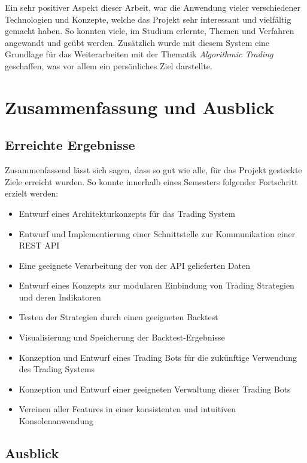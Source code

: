 \documentclass[oneside]{ausarbeitung}
\begin{document}
Ein sehr positiver Aspekt dieser Arbeit, war die Anwendung vieler verschiedener Technologien und Konzepte, welche das Projekt sehr interessant und vielfältig gemacht haben. So konnten viele, im Studium erlernte, Themen und Verfahren angewandt und geübt werden. Zusätzlich wurde mit diesem System eine Grundlage für das Weiterarbeiten mit der Thematik \textit{Algorithmic Trading} geschaffen, was vor allem ein persönliches Ziel darstellte.

\chapter{Zusammenfassung und Ausblick}
\label{cha:zusammenfassung}

\section{Erreichte Ergebnisse}
\label{sec:ergebnisse}

Zusammenfassend lässt sich sagen, dass so gut wie alle, für das Projekt gesteckte Ziele erreicht wurden. So konnte innerhalb eines Semesters folgender Fortschritt erzielt werden:

\begin{itemize}
	\item Entwurf eines Architekturkonzepts für das Trading System
	\item Entwurf und Implementierung einer Schnittstelle zur Kommunikation einer
		REST API
	\item Eine geeignete Verarbeitung der von der API gelieferten Daten
	\item Entwurf eines Konzepts zur modularen Einbindung von Trading Strategien
		und deren Indikatoren
	\item Testen der Strategien durch einen geeigneten Backtest
	\item Visualisierung und Speicherung der Backtest-Ergebnisse
	\item Konzeption und Entwurf eines Trading Bots für die zukünftige Verwendung
		des Trading Systems
	\item Konzeption und Entwurf einer geeigneten Verwaltung dieser Trading Bots
	\item Vereinen aller Features in einer konsistenten und intuitiven
		Konsolenanwendung
\end{itemize}

\section{Ausblick}
\label{sec:ausblick}
\end{document}

